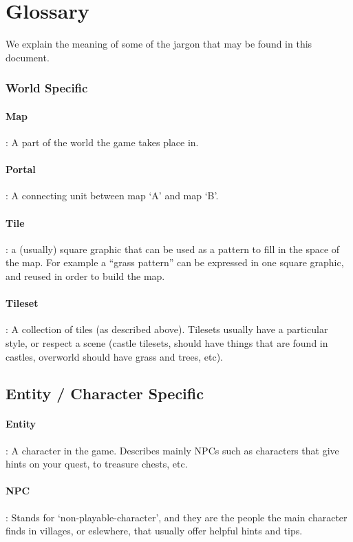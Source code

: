 \section{Glossary} 

We explain the meaning of some of the jargon that may be found in this
document.

\subsubsection{World Specific}

\paragraph{Map}: A part of the world the game takes place in. 

\paragraph{Portal}: A connecting unit between map `A' and map `B'. 

\paragraph{Tile}: a (usually) square graphic that can be used as a pattern to 
fill in the space of the map. For example a ``grass pattern'' can be expressed
in one square graphic, and reused in order to build the map. 

\paragraph{Tileset}: A collection of tiles (as described above). Tilesets
usually have a particular style, or respect a scene (castle tilesets, should 
have things that are found in castles, overworld should have grass and trees,
etc).

\subsection{Entity / Character Specific} 

\paragraph{Entity}: A character in the game. Describes mainly NPCs such as 
characters that give hints on your quest, to treasure chests, etc. 

\paragraph{NPC}: Stands for `non-playable-character', and they are the people
the main character finds in villages, or eslewhere, that usually offer helpful
hints and tips.


